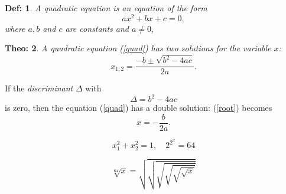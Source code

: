 \documentclass{article}
\newtheorem{thm}{Theo:}
\newtheorem{dfn}[thm]{Def:}
\begin{document}
\begin{dfn}

A quadratic equation is an equation of the form
\begin{equation}
  \label{quad}
  ax^2 + bx + c = 0,
\end{equation}
where \(a, b\) and \(c \) are constants and $a \neq 0$,
\end{dfn}

\begin{thm}
A quadratic equation (\ref{quad}) has two solutions for the variable $x$:
\begin{equation}
  \label{root}
  x_{1, 2} = \frac{-b \pm \sqrt{b^2 - 4ac}}{2a}.
\end{equation}
\end{thm}
If the \emph{discriminant} $\Delta$ with
$$
\Delta = b^2 - 4 a c
$$
is zero, then the equation (\ref{quad}) has a double solution:
(\ref{root}) becomes
$$
x = -\frac{b}{2a}.
$$

\begin{equation}
   x_1^2 + x_2^2 = 1, \quad 2^{2^x} = 64
\end{equation}

\begin{equation}
   \sqrt[64]{x} = \sqrt{\sqrt{\sqrt{\sqrt{\sqrt{\sqrt{x}}}}}}
\end{equation}
\end{document}

